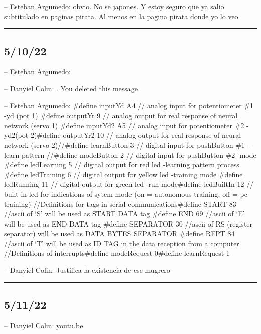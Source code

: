 -- Esteban Argumedo: obvio. No se japones. Y estoy seguro que ya salio
subtitulado en paginas pirata. Al menos en la pagina pirata donde yo lo
veo

\begin{center}\rule{0.5\linewidth}{0.5pt}\end{center}

\hypertarget{section-74}{%
\subsection{5/10/22}\label{section-74}}

-- Esteban Argumedo:

-- Danyiel Colin: . You deleted this message

-- Esteban Argumedo: \#define inputYd A4 // analog input for
potentiometer \#1 -yd (pot 1) \#define outputYr 9 // analog output for
real response of neural network (servo 1) \#define inputYd2 A5 // analog
input for potentiometer \#2 -yd2(pot 2)\#define outputYr2 10 // analog
output for real response of neural network (servo 2)//\#define
learnButton 3 // digital input for pushButton \#1 -learn pattern
//\#define modeButton 2 // digital input for pushButton \#2 -mode
\#define ledLearning 5 // digital output for red led -learning pattern
process \#define ledTraining 6 // digital output for yellow led
-training mode \#define ledRunning 11 // digital output for green led
-run mode\#define ledBuiltIn 12 // built-in led for indications of sytem
mode (on = autonomous training, off = pc training) //Definitions for
tags in serial communications\#define START 83 //ascii of `S' will be
used as START DATA tag \#define END 69 //ascii of `E' will be used as
END DATA tag \#define SEPARATOR 30 //ascii of RS (register separator)
will be used as DATA BYTES SEPARATOR \#define RFPT 84 //ascii of `T'
will be used as ID TAG in the data reception from a computer
//Definitions of interrupts\#define modeRequest 0\#define learnRequest 1

-- Danyiel Colin: Justifica la existencia de ese mugrero

\begin{center}\rule{0.5\linewidth}{0.5pt}\end{center}

\hypertarget{section-75}{%
\subsection{5/11/22}\label{section-75}}

-- Danyiel Colin: \href{https://youtu.be/gILgBXEa2MU}{youtu.be}

